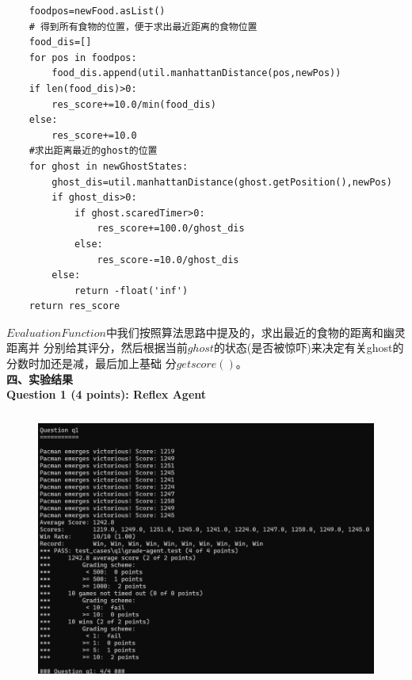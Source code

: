 \documentclass[a4paper,12pt,UTF8]{article}
\begin{document}
\begin{flushleft}
{{\begin{lstlisting}
    foodpos=newFood.asList()
    # 得到所有食物的位置，便于求出最近距离的食物位置
    food_dis=[]
    for pos in foodpos:
        food_dis.append(util.manhattanDistance(pos,newPos))
    if len(food_dis)>0:
        res_score+=10.0/min(food_dis)
    else:
        res_score+=10.0
    #求出距离最近的ghost的位置
    for ghost in newGhostStates:
        ghost_dis=util.manhattanDistance(ghost.getPosition(),newPos)
        if ghost_dis>0:
            if ghost.scaredTimer>0:
                res_score+=100.0/ghost_dis
            else:
                res_score-=10.0/ghost_dis
        else:
            return -float('inf')
    return res_score
        \end{lstlisting}
    }
    \normalsize{
        \hspace{1cm}$Evaluation Function$中我们按照算法思路中提及的，求出最近的食物的距离和幽灵距离并
        分别给其评分，然后根据当前$ghost$的状态(是否被惊吓)来决定有关ghost的分数时加还是减，最后加上基础
        分$getscore()$。\\
    }
    \Large{
        \textbf{
            四、实验结果\\
        }
    }
    \large{
        \hspace{1cm}\textbf{
            Question 1 (4 points): Reflex Agent\\
        }
    }
    \begin{figure}[h]
        \centering
        \includegraphics[width=12cm,height=9cm]{1.png}
    \end{figure}

}
\end{flushleft}
\end{document}
